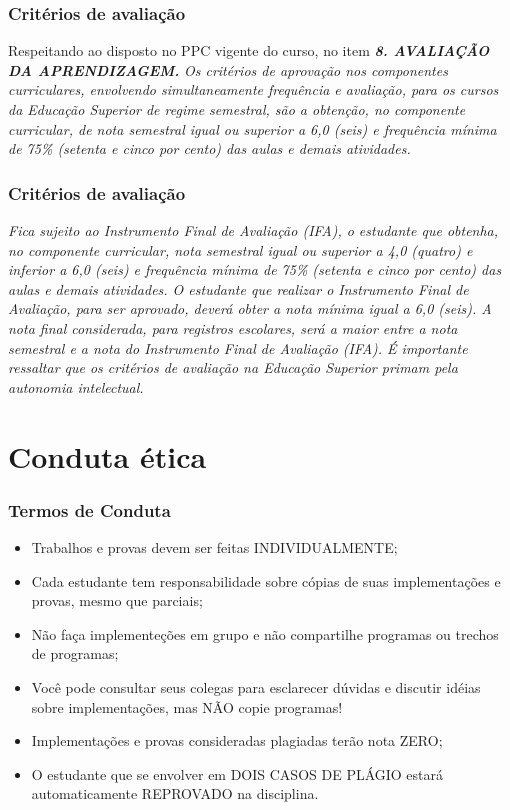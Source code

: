 \documentclass{beamer}
\begin{document}
\begin{frame}[fragile]\justifying
      \frametitle{Critérios de avaliação}
      Respeitando ao disposto no PPC vigente do curso, no item \textbf{\textit{8. AVALIAÇÃO DA APRENDIZAGEM. }}
      \newline
      \newline
      \textit{Os critérios de aprovação nos componentes curriculares, envolvendo simultaneamente frequência e avaliação, para os cursos da Educação Superior de 
      regime semestral, são a obtenção, no componente curricular, de nota semestral igual ou superior a 6,0 (seis) e frequência mínima de 75\% (setenta e cinco por cento) das
      aulas e demais atividades. }
\end{frame}

\begin{frame}[fragile]\justifying
      \frametitle{Critérios de avaliação}
      \textit{Fica sujeito ao Instrumento Final de Avaliação (IFA), o estudante que obtenha, no componente curricular, nota semestral igual ou superior a
      4,0 (quatro) e inferior a 6,0 (seis) e frequência mínima de 75\% (setenta e cinco por cento) das aulas e demais atividades. O estudante que realizar o Instrumento Final de
      Avaliação, para ser aprovado, deverá obter a nota mínima igual a 6,0 (seis). A nota final considerada, para registros escolares, será a maior entre a nota semestral e a nota do
      Instrumento Final de Avaliação (IFA). 
      \newline
      \newline
      É importante ressaltar que os critérios de avaliação na Educação Superior primam pela autonomia intelectual.}
\end{frame}

\section{Conduta ética}
\begin{frame}
\frametitle{Termos de Conduta}
      \begin{itemize}
            \item Trabalhos e provas devem ser feitas INDIVIDUALMENTE;
            \item Cada estudante tem responsabilidade sobre cópias de suas implementações e provas, mesmo que parciais;
            \item Não faça implementeções em grupo e não compartilhe programas ou trechos de programas;
            \item Você pode consultar seus colegas para esclarecer dúvidas e discutir idéias sobre implementações, mas NÃO copie programas!
            \item Implementações e provas consideradas plagiadas terão nota ZERO;
            \item O estudante que se envolver em DOIS CASOS DE PLÁGIO estará automaticamente REPROVADO na disciplina.
      \end{itemize}
\end{frame}
\end{document}
